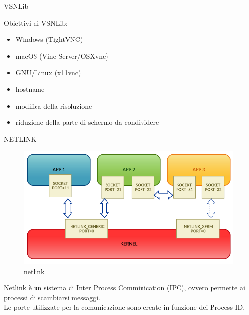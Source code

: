 \documentclass{beamer}
\begin{document}
\begin{frame}[fragile]{VSNLib}

Obiettivi di VSNLib:\newline
\begin{itemize}
    \item Windows (TightVNC)
    \item macOS (Vine Server/OSXvnc)
    \item GNU/Linux (x11vnc)

\end{itemize}

\begin{itemize}
    \item hostname
    \item modifica della risoluzione
    \item riduzione della parte di schermo da condividere
\end{itemize}
\end{frame}

\begin{frame}[fragile]{NETLINK}
	\begin{figure}[t!]
	\includegraphics[scale=0.4]{img/netlink_comunication}
	\caption{netlink}
	\end{figure}
	\vspace{1em}
Netlink \`e un sistema di Inter Process Comminication (IPC), ovvero permette ai processi di scambiarsi messaggi.\\
Le porte utilizzate per la comunicazione sono create in funzione dei Process ID.\\
%

\end{frame}
\end{document}
